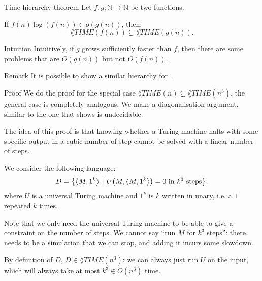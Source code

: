 \documentclass[a4paper]{article}
\begin{document}
\begin{parag}{Time-hierarchy theorem}
    Let $f, g: \mathbb{N} \mapsto \mathbb{N}$ be two functions.

    If $f\left(n\right) \log\left(f\left(n\right)\right) \in o\left(g\left(n\right)\right)$, then:
    \[\lang{TIME}\left(f\left(n\right)\right) \subsetneq \lang{TIME}\left(g\left(n\right)\right).\]

    \begin{subparag}{Intuition}
        Intuitively, if $g$ grows sufficiently faster than $f$, then there are some problems that are $O\left(g\left(n\right)\right)$ but not $O\left(f\left(n\right)\right)$.
    \end{subparag}

    \begin{subparag}{Remark}
        It is possible to show a similar hierarchy for .
    \end{subparag}

    \begin{subparag}{Proof}
        We do the proof for the special case $\lang{TIME}\left(n\right) \subsetneq \lang{TIME}\left(n^3\right)$, the general case is completely analogous. We make a diagonalisation argument, similar to the one that shows  is undecidable.

        The idea of this proof is that knowing whether a Turing machine halts with some specific output in a cubic number of step cannot be solved with a linear number of steps.

        We consider the following language: 
        \[D = \left\{\left\langle M, 1^k \right\rangle \suchthat U\left(M, \left\langle M, 1^k \right\rangle\right) = 0 \text{ in $k^3$ steps}\right\},\]
        where $U$ is a universal Turing machine and $1^k$ is $k$ written in unary, i.e. a $1$ repeated $k$ times.

        Note that we only need the universal Turing machine to be able to give a constraint on the number of steps. We cannot say ``run $M$ for $k^3$ steps'': there needs to be a simulation that we can stop, and adding it incurs some slowdown.

        By definition of $D$, $D \in \lang{TIME}\left(n^3\right)$: we can always just run $U$ on the input, which will always take at most $k^3 \in O\left(n^3\right)$ time.


\end{subparag}
\end{parag}
\end{document}
